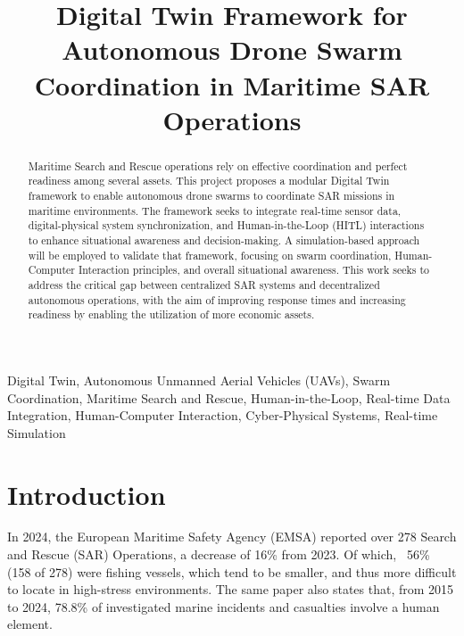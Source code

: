 \documentclass[conference]{IEEEtran}
\begin{document}
    \title{Digital Twin Framework for Autonomous Drone Swarm Coordination in Maritime SAR Operations}

    \author{
    }

    \maketitle

    \begin{abstract}
        Maritime Search and Rescue operations rely on effective coordination and perfect readiness among several assets.
        This project proposes a modular Digital Twin framework to enable autonomous drone swarms to coordinate SAR missions in maritime environments.
        The framework seeks to integrate real-time sensor data, digital-physical system synchronization, and Human-in-the-Loop (HITL) interactions to enhance situational awareness and decision-making.
        A simulation-based approach will be employed to validate that framework, focusing on swarm coordination, Human-Computer Interaction principles, and overall situational awareness.
        This work seeks to address the critical gap between centralized SAR systems and decentralized autonomous operations, with the aim of improving response times and increasing readiness by enabling the utilization of more economic assets.
    \end{abstract}

    \begin{IEEEkeywords}
        Digital Twin, Autonomous Unmanned Aerial Vehicles (UAVs), Swarm Coordination, Maritime Search and Rescue, Human-in-the-Loop, Real-time Data Integration, Human-Computer Interaction, Cyber-Physical Systems, Real-time Simulation
    \end{IEEEkeywords}

    \section{Introduction}\label{sec:introduction}
        In 2024, the European Maritime Safety Agency (EMSA) reported over 278 Search and Rescue (SAR) Operations, a decrease of 16\% from 2023.
        Of which, ~56\% (158 of 278) were fishing vessels, which tend to be smaller, and thus more difficult to locate in high-stress environments.
        The same paper also states that, from 2015 to 2024, 78.8\% of investigated marine incidents and casualties involve a human element.
    
    
\end{document}

